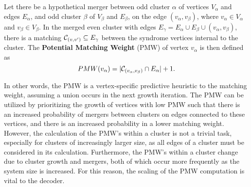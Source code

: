 \begin{definition}\label{def:pmw}
    Let there be a hypothetical merger between odd cluster $\alpha$ of vertices $V_\alpha$ and edges $E_\alpha$, and odd cluster $\beta$ of $V_\beta$ and $E_\beta$, on the edge $(v_\alpha, v_\beta)$, where $v_\alpha \in V_\alpha$ and $v_\beta \in V_\beta$. In the merged even cluster with edges $E_{\gamma} = E_\alpha \cup E_\beta \cup (v_\alpha, v_\beta)$, there is a matching $\mathcal{C}_{(v,v')} \subseteq E_{\gamma}$  between the syndrome vertices internal to the cluster. The \textbf{Potential Matching Weight} (PMW) of vertex $v_\alpha$ is then defined as
    \begin{equation}
      PMW(v_\alpha) = \lvert\mathcal{C}_{(v_\alpha,v_\beta)} \cap E_\alpha\rvert + 1.
    \end{equation}
\end{definition}

In other words, the PMW is a vertex-specific predictive heuristic to the matching weight, assuming a union occurs in the next growth iteration. The PMW can be utilized by prioritizing the growth of vertices with low PMW such that there is an increased probability of mergers between clusters on edges connected to these vertices, and there is an increased probability in a lower matching weight. However, the calculation of the PMW's within a cluster is not a trivial task, especially for clusters of increasingly larger size, as all edges of a cluster must be considered in its calculation. Furthermore, the PMW's within a cluster change due to cluster growth and mergers, both of which occur more frequently as the system size is increased. For this reason, the scaling of the PMW computation is vital to the decoder. 

